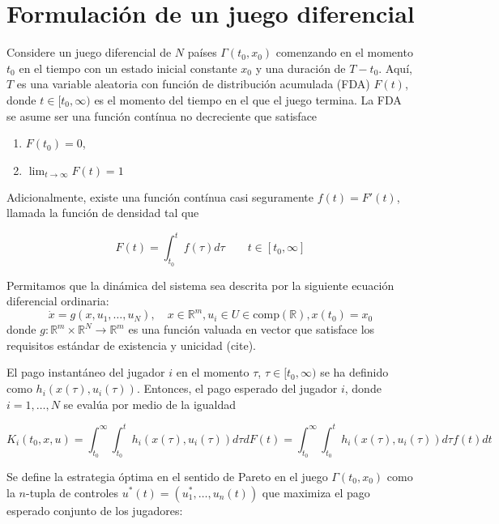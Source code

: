 \section{Formulación de un juego diferencial}

Considere un juego diferencial de $N$ países $\Gamma(t_0,x_0)$ comenzando en el momento $t_0$ en el tiempo con un estado inicial constante $x_0$ y una duración de $T-t_0$. Aquí, $T$ es una variable aleatoria con función de distribución acumulada (FDA) $F(t)$, donde $t\in[t_0,\infty)$ es el momento del tiempo en el que el juego termina. La FDA se asume ser una función contínua no decreciente que satisface

\begin{enumerate}
	\item $F(t_0) = 0$,
	\item $\lim_{t\to\infty}F(t)=1$
\end{enumerate}

Adicionalmente, existe una función contínua casi seguramente $f(t) = F'(t)$, llamada la función de densidad tal que

\begin{equation}
	F(t) = \int_{t_0}^t f(\tau)d\tau \qquad t \in [t_0,\infty]
\end{equation}

Permitamos que la dinámica del sistema sea descrita por la siguiente ecuación diferencial ordinaria:
\begin{equation}
	\dot{x} = g(x, u_1,\dots,u_N), \quad x\in\mathbb{R}^m, u_i \in U\in \mbox{comp}(\mathbb{R}), x(t_0) = x_0
\end{equation}
donde $g : \mathbb{R}^m\times \mathbb{R}^N \to \mathbb{R}^m$ es una función valuada en vector que satisface los requisitos estándar de existencia y unicidad (cite).

El pago instantáneo del jugador $i$ en el momento $\tau$, $\tau \in [t_0,\infty)$ se ha definido como $h_i(x(\tau), u_i(\tau))$. Entonces, el pago esperado del jugador $i$, donde $i = 1,\dots,N$ se evalúa por medio de la igualdad

\begin{equation}
	K_i(t_0, x, u) = \int_{t_0}^\infty\int_{t_0}^t h_i(x(\tau), u_i(\tau)) d\tau dF(t) = \int_{t_0}^\infty\int_{t_0}^t h_i(x(\tau), u_i(\tau)) d\tau f(t) dt
\end{equation}

Se define la estrategia óptima en el sentido de Pareto en el juego $\Gamma(t_0,x_0)$ como la $n$-tupla de controles $u^*(t) = (u_1^*, \dots, u_n(t))$ que maximiza el pago esperado conjunto de los jugadores:


